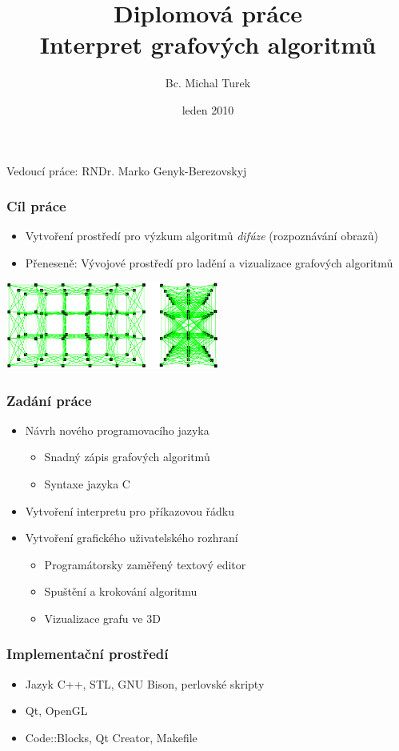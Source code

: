 \documentclass{beamer}
\title[Interpret grafových algoritmů]{\normalsize{Diplomová práce\\Interpret grafových algoritmů}}
\author{Bc. Michal Turek}
\institute{FEL ČVUT v Praze}
\date{\small{leden 2010}}
\begin{document}
\begin{frame}
	\titlepage
	\begin{center}
	\small{Vedoucí práce: RNDr. Marko Genyk-Berezovskyj}
	\end{center}
\end{frame}


\begin{frame}
	\frametitle{Cíl práce}
	\begin{itemize}
	\item Vytvoření prostředí pro výzkum algoritmů \textit{difúze} (rozpoznávání obrazů)
	\item Přeneseně: Vývojové prostředí pro ladění a vizualizace grafových algoritmů
	\end{itemize}

	\begin{center}
	\includegraphics[width=7cm]{../text/img/graf_difuze.pdf}
	\end{center}
\end{frame}


\begin{frame}
	\frametitle{Zadání práce}
	\begin{itemize}
	\item Návrh nového programovacího jazyka
		\begin{itemize}
		\item Snadný zápis grafových algoritmů
		\item Syntaxe jazyka C
		\end{itemize}
	\item Vytvoření interpretu pro příkazovou řádku
	\item Vytvoření grafického uživatelského rozhraní
		\begin{itemize}
		\item Programátorsky zaměřený textový editor
		\item Spuštění a krokování algoritmu
		\item Vizualizace grafu ve 3D
		\end{itemize}
	\end{itemize}
\end{frame}


\begin{frame}
	\frametitle{Implementační prostředí}
	\begin{itemize}
	\item Jazyk C++, STL, GNU Bison, perlovské skripty
	\item Qt, OpenGL
	\item Code::Blocks, Qt Creator, Makefile
	\end{itemize}
\end{frame}
\end{document}

